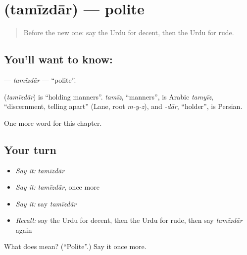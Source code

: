 \section[\texorpdfstring{\ur{تمیزدار} (tamīzdār)}{تمیزدار (tamīzdār)}]{ (tamīzdār) — polite}

\label{lesson:UR-C223-tamizdar}



\begin{quote}
Before the new one: say the Urdu for decent, then the Urdu for rude.
\end{quote}

\subsection*{You'll want to know: }
\textbf{} — \emph{tamīzdār} — \textquotedblleft{}polite\textquotedblright{}.

\begin{cousinweb}
\textbf{} (\emph{tamīzdār}) is \textquotedblleft{}holding manners\textquotedblright{}. \emph{tamīz}, \textquotedblleft{}manners\textquotedblright{}, is Arabic \emph{tamyīz}, \textquotedblleft{}discernment, telling apart\textquotedblright{} (Lane, root \emph{m-y-z}), and \emph{-dār}, \textquotedblleft{}holder\textquotedblright{}, is Persian.
\end{cousinweb}

\begin{grammarlens}[title={What you've built}]
One more word for this chapter.
\end{grammarlens}

\subsection*{Your turn}
\begin{itemize}
\raggedright
  \item \emph{Say it:} \emph{tamīzdār}
  \item \emph{Say it:} \emph{tamīzdār}, once more
  \item \emph{Say it:} say \emph{tamīzdār}
  \item \emph{Recall:} say the Urdu for decent, then the Urdu for rude, then say \emph{tamīzdār} again
\end{itemize}

\begin{tcolorbox}[breakable,colback=teal!4,colframe=teal!35!black,title={Before you move on}]
What does  mean? (\textquotedblleft{}Polite\textquotedblright{}.) Say it once more.
\end{tcolorbox}
